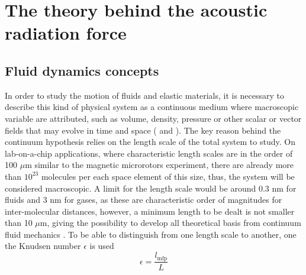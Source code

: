 \chapter{The theory behind the acoustic radiation force}

\section{Fluid dynamics concepts}\label{intro.sec:fluids}
In order to study the motion of fluids and elastic materials, it is necessary to describe this kind of physical system as a continuous medium where macroscopic variable are attributed, such as volume, density, pressure or other scalar or vector fields that may evolve in time and space (\cite{Landau} and \cite{Bruus2011_01}). The key reason behind the continuum hypothesis relies on the length scale of the total system to study. On lab-on-a-chip applications, where characteristic length scales are in the order of 100 $\mu$m similar to the magnetic microrotors experiment, there are already more than $10^{23}$ molecules per each space element of this size, thus, the system will be considered macroscopic. A limit for the length scale would be around 0.3 nm for fluids and 3 nm for gases, as these are characteristic order of magnitudes for inter-molecular distances, however, a minimum length to be dealt is not smaller than 10 $\mu$m, giving the possibility to develop all theoretical basis from continuum fluid mechanics \cite[sec.~1.1.2]{Bruus_book}. To be able to distinguish from one length scale to another, one the Knudsen number $\epsilon$ is used
\begin{equation}
    \epsilon = \frac{l_{\text{mfp}}}{L}
\end{equation}
